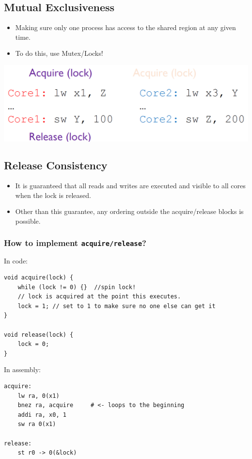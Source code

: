 \documentclass[10pt]{article}
\begin{document}
\subsection*{Mutual Exclusiveness}
\begin{itemize}
    \item Making sure only one process has access to the shared region at any given time.
    \item To do this, use Mutex/Locks!
\end{itemize}
\begin{center}
    \includegraphics*[scale=0.4]{W9_8.png}
\end{center}
\subsection*{Release Consistency}
\begin{itemize}
    \item It is guaranteed that all reads and writes are executed and visible to all cores when the lock is released.
    \item Other than this guarantee, any ordering outside the acquire/release blocks is possible.
\end{itemize}
\subsubsection*{How to implement \texttt{acquire/release}?}
In code:
\begin{verbatim}
void acquire(lock) {
    while (lock != 0) {}  //spin lock!
    // lock is acquired at the point this executes.
    lock = 1; // set to 1 to make sure no one else can get it
}

void release(lock) {
    lock = 0;
}
\end{verbatim}
In assembly:
\begin{verbatim}
acquire:
    lw ra, 0(x1)
    bnez ra, acquire     # <- loops to the beginning
    addi ra, x0, 1
    sw ra 0(x1)

release:
    st r0 -> 0(&lock)
\end{verbatim}
\end{document}
